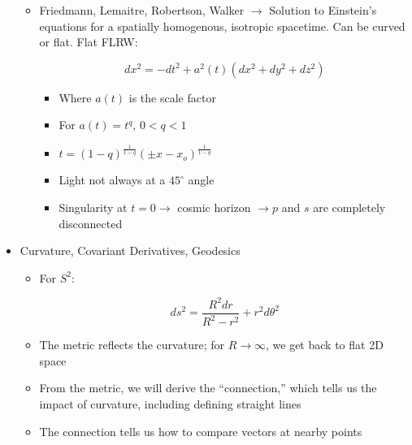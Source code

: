 \begin{itemize}
\begin{itemize}
      \item Friedmann, Lemaitre, Robertson, Walker $\to$ Solution to Einstein's equations for a spatially homogenous, isotropic spacetime. Can be curved or flat. Flat FLRW:

        $$dx^2=-dt^2+a^2(t)(dx^2+dy^2+dz^2)$$

        \begin{itemize}

          \item Where $a(t)$ is the scale factor

          \item For $a(t)=t^q$, $0<q<1$

          \item $t=(1-q)^{\frac{1}{1-q}}(\pm x-x_o)^{\frac{1}{1-q}}$

          \item Light not always at a $45^{\circ}$ angle

          \item Singularity at $t=0\to$ cosmic horizon $\to p$ and $s$ are completely disconnected

        \end{itemize}

    \end{itemize}

  \item Curvature, Covariant Derivatives, Geodesics

    \begin{itemize}

      \item For $S^2$:

        $$ds^2=\frac{R^2dr}{R^2-r^2}+r^2d\theta^2$$

      \item The metric reflects the curvature; for $R\to\infty$, we get back to flat 2D space

      \item From the metric, we will derive the ``connection,'' which tells us the impact of curvature, including defining straight lines

      \item The connection tells us how to compare vectors at nearby points
        
    \end{itemize}

\end{itemize}



